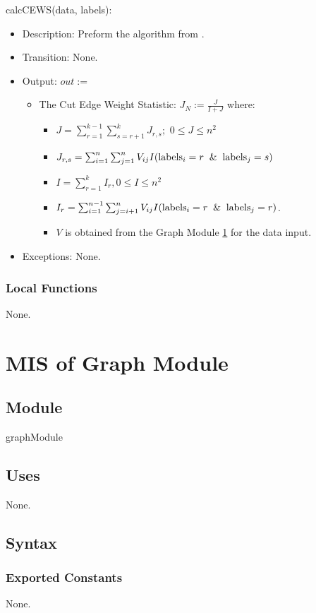 \documentclass[12pt, titlepage]{article}
\begin{document}
\noindent calcCEWS(data, labels):
\begin{itemize}
\item Description: Preform the algorithm from \cite{zighed_statistical_2005}.
\item Transition: None.
\item Output: $out:=$
\begin{itemize}
\item The Cut Edge Weight Statistic: $J_{N} := \frac {J}{I+J}$ where:
\begin{itemize}
\item $J = \sum_{r=1}^{k-1} \sum_{s=r+1}^{k} J_{r,s};$ $ 0 \leq J \leq n^2$
\item $J_{r,s}  = \sum^{n}_{i=1} \sum^n_{j=1} V_{ij} I(\mbox{labels}_i = r \And \mbox{labels}_j = s)$ 
\item $I = \sum_{r=1}^{k} I_r, 0\leq I \leq  n^2$ 
\item $I_{r}  = \sum^{n-1}_{i=1} \sum^n_{j=i+1} V_{ij} I(\mbox{labels}_i = r \And \mbox{labels}_j = r)$. 
\item $V$ is obtained from the Graph Module \ref{M_G} for the data input.
\end{itemize}
\end{itemize}
\item Exceptions: None.
\end{itemize}


\subsubsection{Local Functions}
None.

\newpage
\section{MIS of Graph Module} \label{M_G}

\subsection{Module}
graphModule

\subsection{Uses}
None.

\subsection{Syntax}
\subsubsection{Exported Constants}
None.
\end{document}
